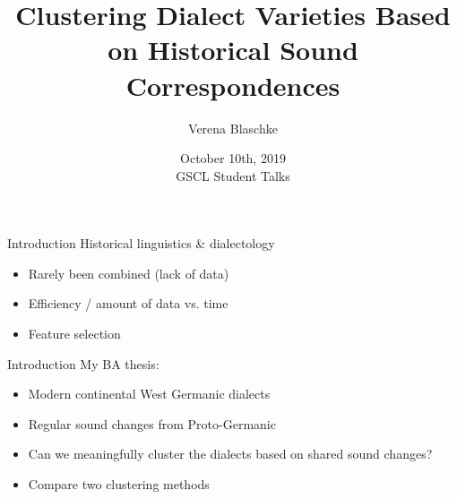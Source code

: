 \documentclass[xcolor={dvipsnames}]{beamer}
\title{Clustering Dialect Varieties Based on Historical Sound Correspondences}
\author{Verena Blaschke}
\date{October 10th, 2019\\GSCL Student Talks}
\newcommand{\hugeSymbol}[1]{{\fontsize{35}{42}\selectfont #1}}
\begin{document}
\begin{frame}
  \titlepage
\end{frame}


\begin{frame}{Introduction}
Historical linguistics \& dialectology

\begin{itemize}
    \item Rarely been combined (lack of data)
\end{itemize}

\vspace{2em}

\hspace{0.15\textwidth}\hugeSymbol{\faBook}\hspace{0.15\textwidth}\hugeSymbol{\faArrowsH}\hspace{0.15\textwidth}\hugeSymbol{\faLaptop}

\vspace{1em}

\begin{itemize}
    \item Efficiency / amount of data vs. time
    \item Feature selection
\end{itemize}
\end{frame}

\begin{frame}{Introduction}
My BA thesis:
\vspace{1em}
\begin{itemize}
    \item Modern continental West Germanic dialects
    \item Regular sound changes from Proto-Germanic
    \vspace{1em}
    \item Can we meaningfully cluster the dialects based on shared sound changes?
    \item Compare two clustering methods
\end{itemize}
\end{frame}
\end{document}
